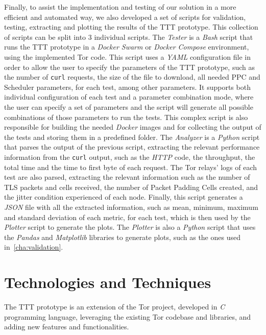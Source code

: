 Finally, to assist the implementation and testing of our solution in a more efficient and automated way, we also developed a set of scripts for validation, testing, extracting and plotting the results of the TTT prototype.  
This collection of scripts can be split into 3 individual scripts.
The \textit{Tester} is a \textit{Bash} script that runs the TTT prototype in a \textit{Docker Swarm} or \textit{Docker Compose} environment, using the implemented Tor code. This script uses a \textit{YAML} configuration file in order to allow the user to specify the parameters of the TTT prototype, such as the number of \texttt{curl} requests, the size of the file to download, all needed PPC and Scheduler parameters, for each test, among other parameters. It supports both individual configuration of each test and a parameter combination mode, where the user can specify a set of parameters and the script will generate all possible combinations of those parameters to run the tests. This complex script is also responsible for building the needed \textit{Docker} images and for collecting the output of the tests and storing them in a predefined folder.
The \textit{Analyzer} is a \textit{Python} script that parses the output of the previous script, extracting the relevant performance information from the \texttt{curl} output, such as the \textit{HTTP} code, the throughput, the total time and the time to first byte of each request. The Tor relays' logs of each test are also parsed, extracting the relevant information such as the number of TLS packets and cells received, the number of Packet Padding Cells created, and the jitter condition experienced of each node. Finally, this script generates a \textit{JSON} file with all the extracted information, such as mean, minimum, maximum and standard deviation of each metric, for each test, which is then used by the \textit{Plotter} script to generate the plots.
The \textit{Plotter} is also a \textit{Python} script that uses the \textit{Pandas} and \textit{Matplotlib} libraries to generate plots, such as the ones used in~\autoref{cha:validation}. 


\section{Technologies and Techniques}\label{sec:technologies_and_techniques}

The TTT prototype is an extension of the Tor project, developed in \textit{C} programming language, leveraging the existing Tor codebase and libraries, and adding new features and functionalities.

